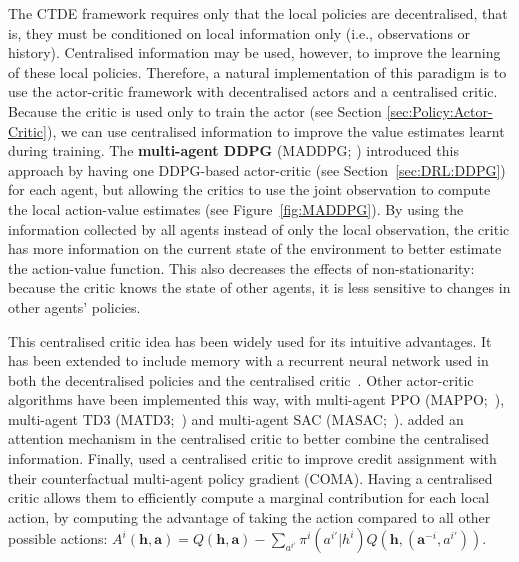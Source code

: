The CTDE framework requires only that the local policies are decentralised, that is, they must be conditioned on local information only (i.e., observations or history). Centralised information may be used, however, to improve the learning of these local policies. Therefore, a natural implementation of this paradigm is to use the actor-critic framework with decentralised actors and a centralised critic. Because the critic is used only to train the actor (see Section \ref{sec:Policy:Actor-Critic}), we can use centralised information to improve the value estimates learnt during training. The \textbf{multi-agent DDPG} (MADDPG; \cite{Lowe2017_MADDPG}) introduced this approach by having one DDPG-based actor-critic (see Section~\ref{sec:DRL:DDPG}) for each agent, but allowing the critics to use the joint observation to compute the local action-value estimates (see Figure~\ref{fig:MADDPG}). By using the information collected by all agents instead of only the local observation, the critic has more information on the current state of the environment to better estimate the action-value function. This also decreases the effects of non-stationarity: because the critic knows the state of other agents, it is less sensitive to changes in other agents' policies. 

This centralised critic idea has been widely used for its intuitive advantages. It has been extended to include memory with a recurrent neural network used in both the decentralised policies and the centralised critic~\citep{Wang2020_RMADDPG}. Other actor-critic algorithms have been implemented this way, with multi-agent PPO (MAPPO;~\cite{Yu2021_MAPPO}), multi-agent TD3 (MATD3;~\cite{Ackermann2019_MATD3}) and multi-agent SAC (MASAC;~\cite{Yu2021_Benchmark}). \citet{Iqbal2019_MAAC} added an attention mechanism in the centralised critic to better combine the centralised information. Finally, \citet{Foerster2018_COMA} used a centralised critic to improve credit assignment with their counterfactual multi-agent policy gradient (COMA). Having a centralised critic allows them to efficiently compute a marginal contribution for each local action, by computing the advantage of taking the action compared to all other possible actions: $A^i(\mathbf{h},\mathbf{a})=Q(\mathbf{h},\mathbf{a})-\sum_{a^{i\prime}}\pi^i(a^{i\prime}|h^i)Q(\mathbf{h},(\mathbf{a}^{-i},a^{i\prime}))$.


